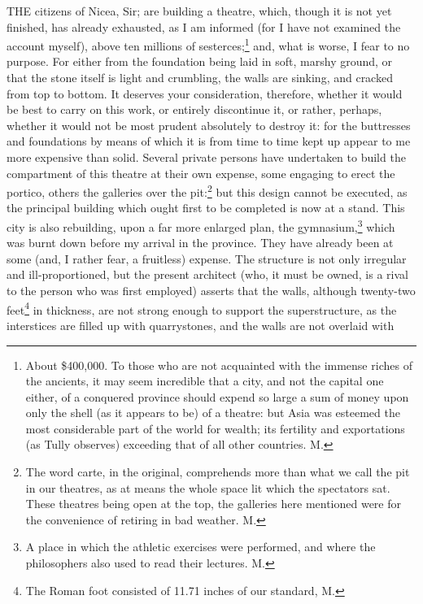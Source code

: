 
THE citizens of Nicea, Sir; are building a theatre, which, though it is
not yet finished, has already exhausted, as I am informed (for I have not
examined the account myself), above ten millions of sesterces;\footnote{About \$400,000. To
those who are not acquainted with the immense riches of the ancients, it
may seem incredible that a city, and not the capital one either, of a
conquered province should expend so large a sum of money upon only the
shell (as it appears to be) of a theatre: but Asia was esteemed the most
considerable part of the world for wealth; its fertility and exportations
(as Tully observes) exceeding that of all other countries. M.}
and, what is worse, I fear to no purpose. For either from the foundation
being laid in soft, marshy ground, or that the stone itself is light and
crumbling, the walls are sinking, and cracked from top to bottom. It
deserves your consideration, therefore, whether it would be best to carry
on this work, or entirely discontinue it, or rather, perhaps, whether it
would not be most prudent absolutely to destroy it: for the buttresses and
foundations by means of which it is from time to time kept up appear to me
more expensive than solid. Several private persons have undertaken to
build the compartment of this theatre at their own expense, some engaging
to erect the portico, others the galleries over the pit:\footnote{The word carte, in
the original, comprehends more than what we call the pit in our theatres,
as at means the whole space lit which the spectators sat. These theatres
being open at the top, the galleries here mentioned were for the
convenience of retiring in bad weather. M.}
but this design cannot be executed, as the principal building which ought
first to be completed is now at a stand. This city is also rebuilding,
upon a far more enlarged plan, the gymnasium,\footnote{A place in which the
athletic exercises were performed, and where the philosophers also used to
read their lectures. M.} which was burnt
down before my arrival in the province. They have already been at some
(and, I rather fear, a fruitless) expense. The structure is not only
irregular and ill-proportioned, but the present architect (who, it must be
owned, is a rival to the person who was first employed) asserts that the
walls, although twenty-two feet\footnote{The Roman foot
consisted of 11.71 inches of our standard, M.} in thickness, are
not strong enough to support the superstructure, as the interstices are
filled up with quarrystones, and the walls are not overlaid with
